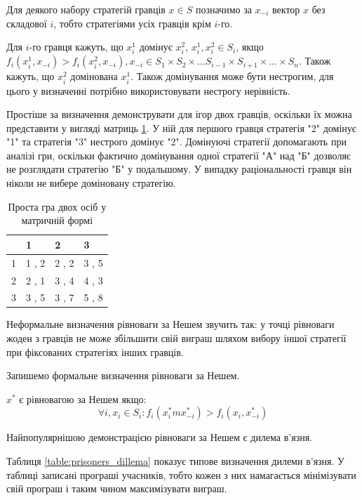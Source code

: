 Для деякого набору стратегій гравців $x \in S$ позначимо за $x_{-i}$ вектор $x$ без складової $i$, тобто стратегіями усіх гравців крім $i$-го.

Для $i$-го гравця кажуть, що $x^1_i$ домінує $x^2_i$, $x^1_i, x^2_i \in S_i$, якщо $f_i(x^1_i, x_{-i}) > f_i(x^2_i, x_{-i}), x_{-i} \in S_1 \times S_2 \times \ldots S_{i-1} \times S_{i+1} \times \ldots \times S_n$. Також кажуть, що $x^2_i$ домінована $x^1_i$. Також домінування може бути нестрогим, для цього у визначенні потрібно використовувати нестрогу нерівність.

Простіше за визначення демонструвати для ігор двох гравців, оскільки їх можна представити у вигляді матриць \ref{table:simple_game}. У ній для першого гравця стратегія "2" домінує "1" та стратегія "3" нестрого домінує "2". Домінуючі стратегії допомагають при аналізі гри, оскільки фактично домінування одної стратегії "А" над "Б" дозволяє не розглядати стратегію "Б" у подальшому. У випадку раціональності гравця він ніколи не вибере доміновану стратегію.

\begin{table}[H]
	\caption{Проста гра двох осіб у матричній формі}
	\label{table:simple_game}
	\centering
	\begin{tabular}{|p{1cm}|p{1cm}|p{1cm}|p{1cm}|}
		\hline
		        & 1     & 2     & 3
		\\ \hline
		1 		& 1 , 2 & 2 , 2 & 3 , 5
		\\ \hline
		2 		& 2 , 1 & 3 , 4 & 4 , 3
		\\ \hline
		3 		& 3 , 5 & 3 , 7 & 5 , 8
		\\ \hline
	\end{tabular}
\end{table}

Неформальне визначення рівноваги за Нешем звучить так: у точці рівноваги жоден з гравців не може збільшити свій виграш шляхом вибору іншої стратегії при фіксованих стратегіях інших гравців.

Запишемо формальне визначення рівноваги за Нешем.

$x^*$ є рівновагою за Нешем якщо:
\begin{equation}
	\forall i, x_i \in S_i : f_i(x^*_im x^*_{-i}) > f_i(x_i, x^*_{-i})	
	\label{eq:nash_equilibrium_def}
\end{equation}

Найпопулярнішою демонстрацією рівноваги за Нешем є дилема в'язня.

Таблиця \ref{table:prisoners_dillema} показує типове визначення дилеми в'язня. У таблиці записані програші учасників, тобто кожен з них намагається мінімізувати свій програш і таким чином максимізувати виграш.

